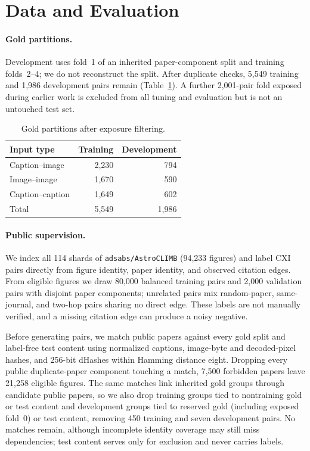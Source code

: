 \section{Data and Evaluation}

\paragraph{Gold partitions.}
Development uses fold~1 of an inherited paper-component split and training folds~2--4; we do not reconstruct the split. After duplicate checks, 5,549 training and 1,986 development pairs remain (Table~\ref{tab:data}). A further 2,001-pair fold exposed during earlier work is excluded from all tuning and evaluation but is not an untouched test set.

\begin{table}[t]
\centering
\small
\begin{tabular}{lrr}
\hline
Input type & Training & Development \\
\hline
Caption--image & 2,230 & 794 \\
Image--image & 1,670 & 590 \\
Caption--caption & 1,649 & 602 \\
\hline
Total & 5,549 & 1,986 \\
\hline
\end{tabular}
\caption{Gold partitions after exposure filtering.}
\label{tab:data}
\end{table}

\paragraph{Public supervision.}
We index all 114 shards of \texttt{adsabs/AstroCLIMB} (94,233 figures) and label CXI pairs directly from figure identity, paper identity, and observed citation edges. From eligible figures we draw 80,000 balanced training pairs and 2,000 validation pairs with disjoint paper components; unrelated pairs mix random-paper, same-journal, and two-hop pairs sharing no direct edge. These labels are not manually verified, and a missing citation edge can produce a noisy negative.

Before generating pairs, we match public papers against every gold split and label-free test content using normalized captions, image-byte and decoded-pixel hashes, and 256-bit dHashes within Hamming distance eight. Dropping every public duplicate-paper component touching a match, 7,500 forbidden papers leave 21,258 eligible figures. The same matches link inherited gold groups through candidate public papers, so we also drop training groups tied to nontraining gold or test content and development groups tied to reserved gold (including exposed fold~0) or test content, removing 450 training and seven development pairs. No matches remain, although incomplete identity coverage may still miss dependencies; test content serves only for exclusion and never carries labels.


